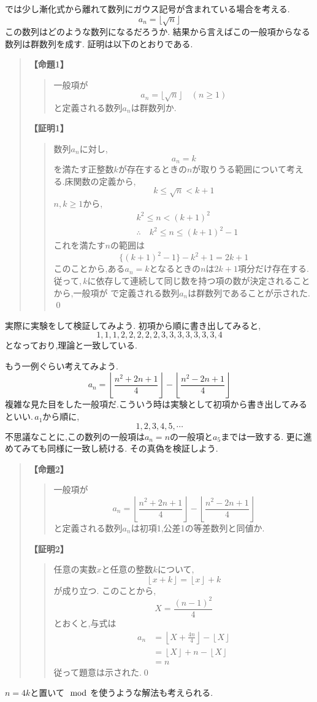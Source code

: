 では少し漸化式から離れて数列にガウス記号が含まれている場合を考える.
\[
  a_{n}=\lfloor \sqrt{n} \rfloor
\]
この数列はどのような数列になるだろうか.
結果から言えばこの一般項からなる数列は群数列を成す.
証明は以下のとおりである.
\begin{quote}
  \noindent \textbf{【命題1】}
  \begin{quote}
    一般項が
    \[
      a_n=\lfloor \sqrt{n} \rfloor\quad(n\ge1)
    \]
    と定義される数列$a_n$は群数列か.
  \end{quote}

  \noindent \textbf{【証明1】}
  \begin{quote}
    数列$a_n$に対し,
    \[
      a_n=k
    \]
    を満たす正整数$k$が存在するときの$n$が取りうる範囲について考える.床関数の定義から,
    \[
      k\le\sqrt{n}<k+1
    \]
    $n,k\ge1$から,
    \begin{align*}
       & k^2\le n <(k+1)^2                      \\
       & \therefore\quad k^2\le n \le (k+1)^2-1
    \end{align*}
    これを満たす$n$の範囲は
    \[
      \{(k+1)^2-1\}-k^2+1=2k+1
    \]
    このことから,ある$a_n=k$となるときの$n$は$2k+1$項分だけ存在する.
    従って,\,$k$に依存して連続して同じ数を持つ項の数が決定されることから,一般項が
    で定義される数列$a_n$は群数列であることが示された. \qed
  \end{quote}
\end{quote}
実際に実験をして検証してみよう.
初項から順に書き出してみると,
\[
  1,1,1,2,2,2,2,2,3,3,3,3,3,3,3,4
\]
となっており,理論と一致している.

もう一例ぐらい考えてみよう.
\[
  a_{n}=\left\lfloor \frac{n^2+2n+1}{4} \right\rfloor -\left\lfloor \frac{n^2-2n+1}{4} \right\rfloor
\]
複雑な見た目をした一般項だ.こういう時は実験として初項から書き出してみるといい.\,$a_1$から順に,
\[
  1,2,3,4,5,\cdots
\]
不思議なことに,この数列の一般項は$a_n=n$の一般項と$a_5$までは一致する.
更に進めてみても同様に一致し続ける.
その真偽を検証しよう.
\begin{quote}
  \noindent \textbf{【命題2】}
  \begin{quote}
    一般項が
    \[
      a_{n}=\left\lfloor \frac{n^2+2n+1}{4} \right\rfloor -\left\lfloor \frac{n^2-2n+1}{4} \right\rfloor
    \]
    と定義される数列$a_n$は初項1,公差1の等差数列と同値か.
  \end{quote}

  \noindent \textbf{【証明2】}
  \begin{quote}
    任意の実数$x$と任意の整数$k$について,
    \[
      \left\lfloor x+k \right\rfloor=\left\lfloor x \right\rfloor +k
    \]
    が成り立つ.
    このことから,
    \[
      X=\frac{(n-1)^2}{4}
    \]
    とおくと,与式は
    \begin{align*}
      a_n & =\left\lfloor X+\frac{4n}{4} \right\rfloor-\left\lfloor X \right\rfloor \\
          & =\left\lfloor X \right\rfloor+n-\left\lfloor X \right\rfloor            \\
          & =n
    \end{align*}
    従って題意は示された.\qed
  \end{quote}
\end{quote}
$n=4k$と置いて$\mod$を使うような解法も考えられる.

